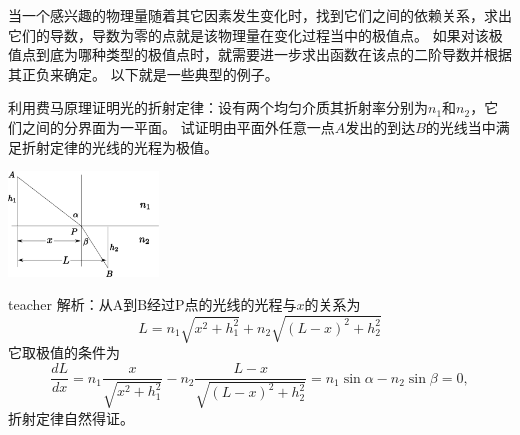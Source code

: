 当一个感兴趣的物理量随着其它因素发生变化时，找到它们之间的依赖关系，求出它们的导数，导数为零的点就是该物理量在变化过程当中的极值点。
如果对该极值点到底为哪种类型的极值点时，就需要进一步求出函数在该点的二阶导数并根据其正负来确定。
以下就是一些典型的例子。
\begin{example}
利用费马原理证明光的折射定律：设有两个均匀介质其折射率分别为$n_1$和$n_2$，它们之间的分界面为一平面。
试证明由平面外任意一点$A$发出的到达$B$的光线当中满足折射定律的光线的光程为极值。
\begin{flushright}
\includegraphics[width=0.3\textwidth]{images/cal-2.pdf} 
\end{flushright}
\begin{taggedblock}{teacher}
\noindent
解析：从A到B经过P点的光线的光程与$x$的关系为
\[L=n_1\sqrt{x^2+h_1^2}+n_2\sqrt{(L-x)^2+h_2^2}\]
它取极值的条件为
\[
\frac{dL}{dx} = n_1\frac{x}{\sqrt{x^2+h_1^2}}-n_2\frac{L-x}{\sqrt{(L-x)^2+h_2^2}}=n_1\sin\alpha-n_2\sin\beta=0,
\]
折射定律自然得证。
\end{taggedblock}
\end{example}



